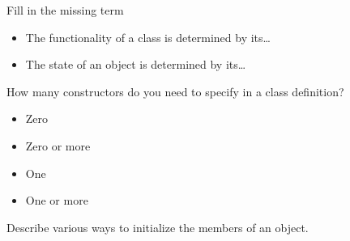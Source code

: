 \begin{review}
  \label{ex:class-review1}
  Fill in the missing term
  \begin{itemize}
  \item The functionality of a class is determined by its\ldots
  \item The state of an object is determined by its\ldots
  \end{itemize}

  How many constructors do you need to specify in a class definition?
  \begin{itemize}
  \item Zero
  \item Zero or more
  \item One
  \item One or more
  \end{itemize}
\end{review}

\begin{review}
  \label{ex:class-review2}
  Describe various ways to initialize the members of an object.
\end{review}

\ifIncludeAnswers
\else
\endinput
\fi

\Level 0 {Homework discussions}

\Level 1 {Square inheritance}
\label{sec:discuss-square}

\begin{multicols}{2}
  \scriptsize
  \lstset{basicstyle=\scriptsize}
  
  \lstset{basicstyle=footnotesize}
\end{multicols}

\Level 1 {Goldbach conjecture}
\label{sec:discuss-goldbach}

\begin{multicols}{2}
  \scriptsize
  \lstset{basicstyle=\scriptsize}
  
  \lstset{basicstyle=footnotesize}
\end{multicols}

